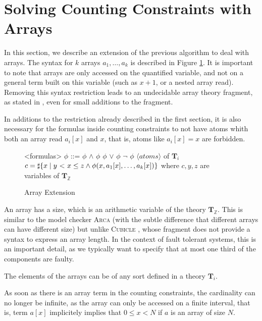 \documentclass[]{article}
\begin{document}
{
\section{Solving Counting Constraints with
Arrays}\label{solving-counting-constraints-with-arrays}

In this section, we describe an extension of the previous algorithm to
deal with arrays. The syntax for $k$ arrays $a_1, \ldots, a_k$ is
described in Figure \ref{syntaxarray}. It is important to note that
arrays are only accessed on the quantified variable, and not on a
general term built on this variable (such as $x + 1$, or a nested
array read). Removing this syntax restriction leads to an undecidable
array theory fragment, as stated in
\cite{bradley2006s}, even for small additions to the
fragment.

In additions to the restriction already described in the first section, it is also necessary for the
formulas inside counting constraints to not have atoms whith both an array read $a_i[x]$ and $x$,
that is, atoms like $a_i[x] = x$ are forbidden.

\begin{figure}[h]
\begin{grammar}
    
<formulas> $\phi$ ::= $\phi$ $\land$ $\phi$
\alt $\phi$ $\lor$ $\phi$
\alt $\lnot$ $\phi$
\alt $\langle atoms\rangle$ of $\mathbf{T}_i$
\alt $c = \sharp\{ x \mid y\ \text{\textless}\ x \le z \land \phi(x, a_1[x], \ldots, a_k[x]) \}$ where $c, y, z$ are variables of $\mathbf{T}_\mathbb{Z}$

\end{grammar}
\caption{Array Extension}
\label{syntaxarray}
\end{figure}


An array has a size, which is an arithmetic variable of the theory
$\mathbf{T}_\mathbb{Z}$. This is similar to the model checker \textsc{Arca}
\cite{AlbertiGP16} (with the subtle difference that
different arrays can have different size) but unlike \textsc{Cubicle}
\cite{ConchonGKMZ12}, whose fragment does not
provide a syntax to express an array length. In the context of fault
tolerant systems, this is an important detail, as we typically want to
specify that at most one third of the components are faulty.

The elements of the arrays can be of any sort defined in a theory $\mathbf{T}_i$.

As soon as there is an array term in the counting constraints, the
cardinality can no longer be infinite, as the array can only be accessed
on a finite interval, that is, term $a[x]$ implicitely implies that $0 \le x < N$ if $a$ is an array of size $N$.

}
\end{document}
